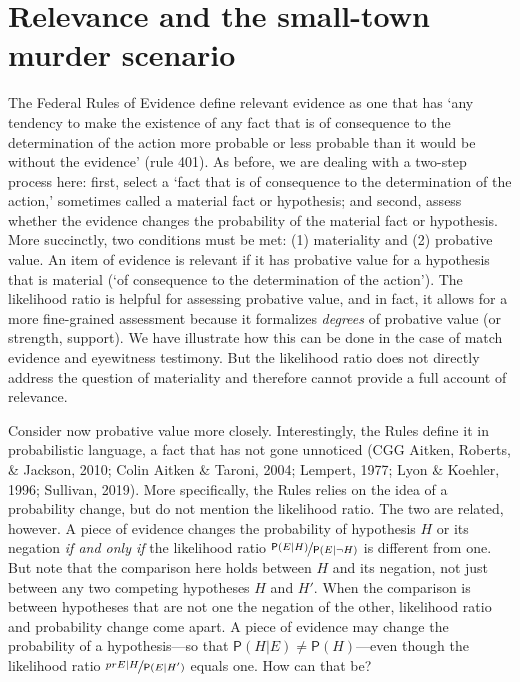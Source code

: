 \documentclass[
  10pt,
  dvipsnames,enabledeprecatedfontcommands]{scrartcl}
\newcommand{\pr}[1]{\mathsf{P}(#1)}
\begin{document}
\hypertarget{relevance-and-the-small-town-murder-scenario}{%
\section{\texorpdfstring{Relevance and the small-town murder scenario
\label{sec:relevance}}{Relevance and the small-town murder scenario }}\label{relevance-and-the-small-town-murder-scenario}}

The Federal Rules of Evidence define relevant evidence as one that has
`any tendency to make the existence of any fact that is of consequence
to the determination of the action more probable or less probable than
it would be without the evidence' (rule 401). As before, we are dealing
with a two-step process here: first, select a `fact that is of
consequence to the determination of the action,' sometimes called a
material fact or hypothesis; and second, assess whether the evidence
changes the probability of the material fact or hypothesis. More
succinctly, two conditions must be met: (1) materiality and (2)
probative value. An item of evidence is relevant if it has probative
value for a hypothesis that is material (`of consequence to the
determination of the action'). The likelihood ratio is helpful for
assessing probative value, and in fact, it allows for a more
fine-grained assessment because it formalizes \textit{degrees} of
probative value (or strength, support). We have illustrate how this can
be done in the case of match evidence and eyewitness testimony. But the
likelihood ratio does not directly address the question of materiality
and therefore cannot provide a full account of relevance.

Consider now probative value more closely. Interestingly, the Rules
define it in probabilistic language, a fact that has not gone unnoticed
(CGG Aitken, Roberts, \& Jackson, 2010; Colin Aitken \& Taroni, 2004;
Lempert, 1977; Lyon \& Koehler, 1996; Sullivan, 2019). More
specifically, the Rules relies on the idea of a probability change, but
do not mention the likelihood ratio. The two are related, however. A
piece of evidence changes the probability of hypothesis \(H\) or its
negation \textit{if and only if} the likelihood ratio
\(\nicefrac{\pr{E \vert H}}{\pr{E\vert \neg H}}\) is different from one.
But note that the comparison here holds between \(H\) and its negation,
not just between any two competing hypotheses \(H\) and \(H'\). When the
comparison is between hypotheses that are not one the negation of the
other, likelihood ratio and probability change come apart. A piece of
evidence may change the probability of a hypothesis---so that
\(\pr{H \vert E}\neq \pr{H}\)---even though the likelihood ratio
\(\nicefrac{pr{E \vert H}}{\pr{E\vert H'}}\) equals one. How can that
be?
\end{document}
